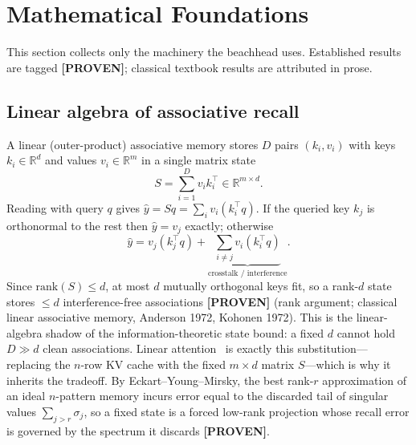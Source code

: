 \section{Mathematical Foundations}

This section collects only the machinery the beachhead uses. Established results are tagged
\textbf{[PROVEN]}; classical textbook results are attributed in prose.

\subsection{Linear algebra of associative recall}
A linear (outer-product) associative memory stores $D$ pairs $(k_i, v_i)$ with keys
$k_i \in \mathbb{R}^{d}$ and values $v_i \in \mathbb{R}^{m}$ in a single matrix state
\begin{equation}
  S = \sum_{i=1}^{D} v_i k_i^\top \in \mathbb{R}^{m \times d}.
\end{equation}
Reading with query $q$ gives $\hat{y} = S q = \sum_i v_i (k_i^\top q)$. If the queried key $k_j$
is orthonormal to the rest then $\hat{y} = v_j$ exactly; otherwise
\begin{equation}
  \hat{y} = v_j (k_j^\top q) + \underbrace{\textstyle\sum_{i \neq j} v_i (k_i^\top q)}_{\text{crosstalk / interference}} .
\end{equation}
Since $\mathrm{rank}(S) \le d$, at most $d$ mutually orthogonal keys fit, so a rank-$d$ state
stores $\le d$ interference-free associations \textbf{[PROVEN]} (rank argument; classical linear
associative memory, Anderson 1972, Kohonen 1972). This is the linear-algebra shadow of the
information-theoretic state bound: a fixed $d$ cannot hold $D \gg d$ clean associations.
Linear attention~\citep{katharopoulos2020transformers} is exactly this substitution---replacing
the $n$-row KV cache with the fixed $m \times d$ matrix $S$---which is why it inherits the
tradeoff. By Eckart--Young--Mirsky, the best rank-$r$ approximation of an ideal
$n$-pattern memory incurs error equal to the discarded tail of singular values $\sum_{j>r}\sigma_j$,
so a fixed state is a forced low-rank projection whose recall error is governed by the spectrum
it discards \textbf{[PROVEN]}.

